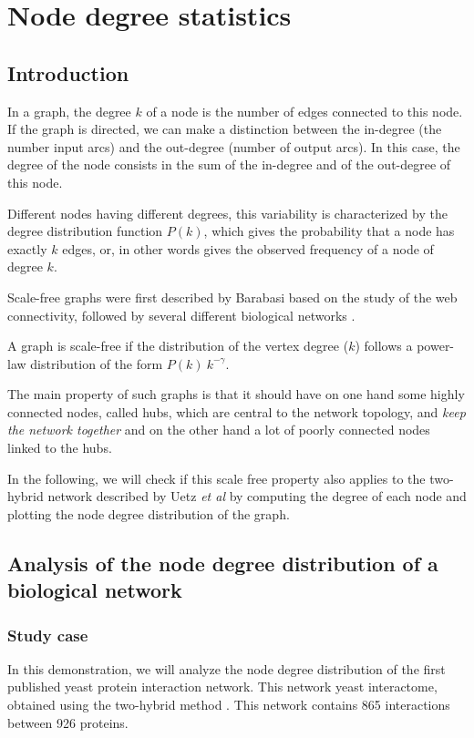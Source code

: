 \chapter{Node degree statistics}

\section{Introduction}
In a graph, the degree $k$ of a node is the number of edges connected to this node.
If the graph is directed, we can make a distinction between the in-degree 
(the number input arcs) and the out-degree (number of output arcs). In this case, the degree of the 
node consists in the sum of the in-degree and of the out-degree of this node.

Different nodes having different degrees, this variability
is characterized by the degree distribution function $P(k)$,
which gives the probability that a node has exactly $k$ edges,
or, in other words gives the observed frequency of a node
of degree $k$.

Scale-free graphs were first described by Barabasi 
based on the study of the web connectivity, followed
by several different biological networks \cite{Jeong2000}.

A graph is scale-free if the distribution of the vertex degree ($k$) follows a power-law distribution of
the form $P(k) ~ k^{-\gamma}$.

The main property of such graphs is that it should have on one hand some highly connected nodes, called hubs, which are central to the network topology, and \textit{keep the network together} and on the other hand a lot of poorly connected nodes linked to the hubs.

In the following, we will check if this scale free property also applies to the two-hybrid network described by Uetz \textit{et al} \cite{Uetz:2000} by computing the degree of each node and plotting the node degree distribution of the graph.
\section{Analysis of the node degree distribution of a biological network}
\subsection{Study case}

In this demonstration, we will analyze the node degree distribution of 
the first published yeast protein interaction network. This network 
yeast interactome, obtained using the two-hybrid method \cite{Uetz:2000}. 
This network contains 865 interactions between 926
proteins.

